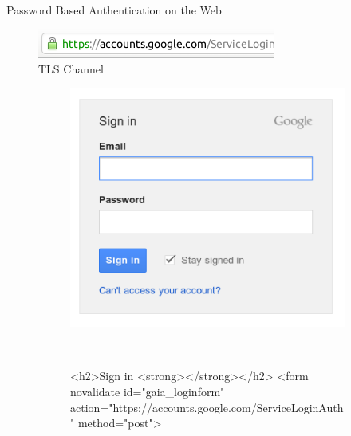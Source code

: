\documentclass[notes]{beamer}
\begin{document}
\newsavebox{\savelisting}
\newenvironment{listing}
{\vspace*{-2em}\begin{lrbox}{\savelisting}
\begin{minipage}{4.8in}
\begin{flushleft}}
{\end{flushleft}
\end{minipage}
\end{lrbox}
\begin{center}
\resizebox{\columnwidth}{!}{\setlength\fboxsep{6pt}\fbox{\usebox{\savelisting}}}
\end{center}}

\begin{frame}[fragile]{Password Based Authentication on the Web}{}

\renewcommand{\figurename}{}
\begin{figure}
	\centering
	\caption{TLS Channel}
	\includegraphics[width=.6\textwidth]{loginForm2.png}
\end{figure}

\begin{figure}
\centering
\caption{HTML Form}
\begin{subfigure}[t]{0.5\textwidth}
	\centering
	\includegraphics[width=\textwidth]{loginForm.png}
\end{subfigure}%
~
\begin{subfigure}[t]{0.5\textwidth}
\centering
\vspace*{-9.75em}
\begin{listing}
\begin{spverbatim}
<h2>Sign in <strong></strong></h2>
<form novalidate id="gaia_loginform" action="https://accounts.google.com/ServiceLoginAuth" method="post">



\end{spverbatim}
\end{listing}
\end{subfigure}
\end{figure}
\end{frame}
\end{document}
